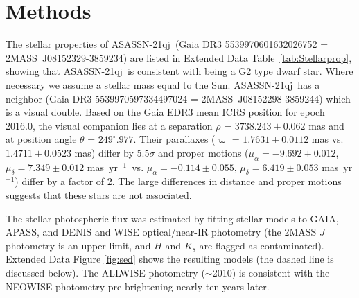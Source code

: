 \documentclass[sn-nature]{sn-jnl}%
\newcommand{\asas}{ASASSN-21qj}
\newcommand{\masyr}{mas~yr$^{-1}$}
\begin{document}
\clearpage





\setcounter{figure}{0}    

\renewcommand\figurename{Extended Data Fig.}%
\renewcommand\tablename{Extended Data Table}%


\section{Methods}\label{sec:methods}

The stellar properties of \asas\ (Gaia DR3 5539970601632026752 = 2MASS~J08152329-3859234) are listed in Extended Data Table~\ref{tab:Stellarprop}, showing that \asas\ is consistent with being a G2 type dwarf star.
%
Where necessary we assume a stellar mass equal to the Sun.
%
\asas\  has a neighbor (Gaia DR3 5539970597334497024 = 2MASS~J08152298-3859244) which is a visual double.
%
Based on the Gaia EDR3 mean ICRS position for epoch 2016.0, the visual companion lies at a separation $\rho$ = $3738.243\pm0.062$ mas and at position angle $\theta$ = $249^{\circ}.977$.
%
Their parallaxes ($\varpi$ = $1.7631\pm0.0112$ mas vs. $1.4711\pm0.0523$ mas) differ by 5.5$\sigma$ and proper motions ($\mu_{\alpha} = -9.692\pm0.012$, $\mu_{\delta} = 7.349\pm0.012$ \masyr\, vs. $\mu_{\alpha} = -0.114\pm0.055$, $\mu_{\delta} = 6.419\pm0.053$ \masyr) differ by a factor of 2.
%
The large differences in distance and proper motions suggests that these stars are not associated.

The stellar photospheric flux was estimated by fitting stellar models to GAIA, APASS, and DENIS and WISE optical/near-IR photometry (the 2MASS $J$ photometry is an upper limit, and $H$ and $K_s$ are flagged as contaminated).
%
Extended Data Figure \ref{fig:sed} shows the resulting models (the dashed line is discussed below).
%
The ALLWISE photometry ($\sim$2010) is consistent with the NEOWISE photometry pre-brightening nearly ten years later.
%
\end{document}
